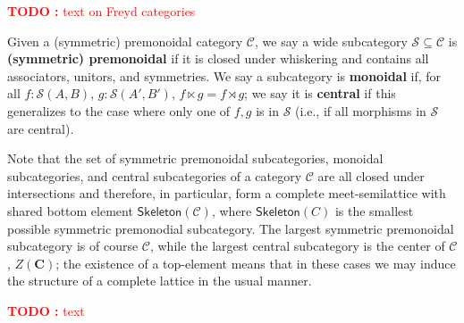 \documentclass[acmsmall,screen,review]{acmart}
\newcounter{todos}
\newcommand{\TODO}[1]{{
  \stepcounter{todos}
  \begin{center}\large{\textcolor{red}{\textbf{TODO \arabic{todos}:} #1}}\end{center}
}}
\newcommand{\mc}[1]{\ensuremath{\mathcal{#1}}}
\newcommand{\mb}[1]{\ensuremath{\mathbf{#1}}}
\newcommand{\ms}[1]{\ensuremath{\mathsf{#1}}}
\begin{document}
\TODO{text on Freyd categories}

\begin{definition}
  Given a (symmetric) premonoidal category \(\mc{C}\), we say a wide subcategory
  \(\mc{S} \subseteq \mc{C}\) is \textbf{(symmetric) premonoidal} if it is
  closed under whiskering and contains all associators, unitors, and symmetries.
  We say a subcategory is \textbf{monoidal} if, for all \(f: \mc{S}(A, B)\),
  \(g: \mc{S}(A', B')\), \(f \ltimes g = f \rtimes g\); we say it is
  \textbf{central} if this generalizes to the case where only one of \(f, g\) is
  in \(\mc{S}\) (i.e., if all morphisms in \(\mc{S}\) are central).
\end{definition} 
Note that the set of symmetric premonoidal subcategories, monoidal
subcategories, and central subcategories of a category \(\mc{C}\) are all closed
under intersections and therefore, in particular, form a complete
meet-semilattice with shared bottom element \(\ms{Skeleton}(\mc{C})\), where
\(\ms{Skeleton}(C)\) is the smallest possible symmetric premonodial subcategory.
The largest symmetric premonoidal subcategory is of course \(\mc{C}\), while the
largest central subcategory is the center of \(\mc{C}\), \(Z(\mb{C})\); the
existence of a top-element means that in these cases we may induce the structure
of a complete lattice in the usual manner.


\TODO{text}
\end{document}
